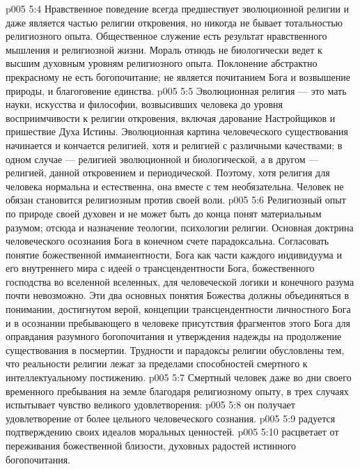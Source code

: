 \vs p005 5:4 \pc Нравственное поведение всегда предшествует эволюционной религии и даже является частью религии откровения, но никогда не бывает тотальностью религиозного опыта. Общественное служение есть результат нравственного мышления и религиозной жизни. Мораль отнюдь не биологически ведет к высшим духовным уровням религиозного опыта. Поклонение абстрактно прекрасному не есть богопочитание; не является почитанием Бога и возвышение природы, и благоговение единства.
\vs p005 5:5 Эволюционная религия --- это мать науки, искусства и философии, возвысивших человека до уровня восприимчивости к религии откровения, включая дарование Настройщиков и пришествие Духа Истины. Эволюционная картина человеческого существования начинается и кончается религией, хотя и религией с различными качествами; в одном случае --- религией эволюционной и биологической, а в другом --- религией, данной откровением и периодической. Поэтому, хотя религия для человека нормальна и естественна, она вместе с тем необязательна. Человек не обязан становится религиозным против своей воли.
\vs p005 5:6 \pc Религиозный опыт по природе своей духовен и не может быть до конца понят материальным разумом; отсюда и назначение теологии, психологии религии. Основная доктрина человеческого осознания Бога в конечном счете парадоксальна. Согласовать понятие божественной имманентности, Бога как части каждого индивидуума и его внутреннего мира с идеей о трансцендентности Бога, божественного господства во вселенной вселенных, для человеческой логики и конечного разума почти невозможно. Эти два основных понятия Божества должны объединяться в понимании, достигнутом верой, концепции трансцендентности личностного Бога и в осознании пребывающего в человеке присутствия фрагментов этого Бога для оправдания разумного богопочитания и утверждения надежды на продолжение существования в посмертии. Трудности и парадоксы религии обусловлены тем, что реальности религии лежат за пределами способностей смертного к интеллектуальному постижению.
\vs p005 5:7 \pc Смертный человек даже во дни своего временного пребывания на земле благодаря религиозному опыту, в трех случаях испытывает чувство великого удовлетворения:
\vs p005 5:8 \bibnobreakspace {} он получает удовлетворение от более цельного человеческого сознания.
\vs p005 5:9 \bibnobreakspace {} радуется подтверждению своих идеалов моральных ценностей.
\vs p005 5:10 \bibnobreakspace {} расцветает от переживания божественной близости, духовных радостей истинного богопочитания.
